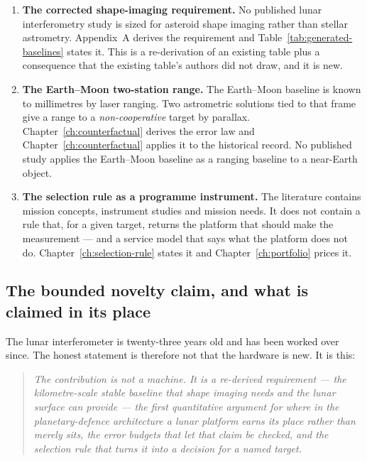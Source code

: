 \begin{enumerate}[leftmargin=2.25em,itemsep=4pt]
\item \textbf{The corrected shape-imaging requirement.} No published lunar
interferometry study is sized for asteroid shape imaging rather than stellar
astrometry. Appendix~A derives the requirement and
Table~\ref{tab:generated-baselines} states it. This is a re-derivation of an
existing table plus a consequence that the existing table's authors did not
draw, and it is new.

\item \textbf{The Earth--Moon two-station range.} The Earth--Moon baseline is
known to millimetres by laser ranging. Two astrometric solutions tied to
that frame give a range to a \emph{non-cooperative} target by parallax.
Chapter~\ref{ch:counterfactual} derives the error law and
Chapter~\ref{ch:counterfactual} applies it to the historical record. No
published study applies the Earth--Moon baseline as a ranging baseline to a
near-Earth object.

\item \textbf{The selection rule as a programme instrument.} The literature
contains mission concepts, instrument studies and mission needs. It does not
contain a rule that, for a given target, returns the platform that should
make the measurement --- and a service model that says what the platform
does not do. Chapter~\ref{ch:selection-rule} states it and
Chapter~\ref{ch:portfolio} prices it.
\end{enumerate}

\subsection*{The bounded novelty claim, and what is claimed in its place}

The lunar interferometer is twenty-three years old and has been worked
over since. The honest statement is therefore not that the hardware is new.
It is this:

\begin{quote}
\small\itshape
The contribution is not a machine. It is a re-derived requirement --- the
kilometre-scale stable baseline that shape imaging needs and the lunar
surface can provide --- the first quantitative argument for where in the
planetary-defence architecture a lunar platform earns its place rather than
merely sits, the error budgets that let that claim be checked, and the
selection rule that turns it into a decision for a named target.
\end{quote}

